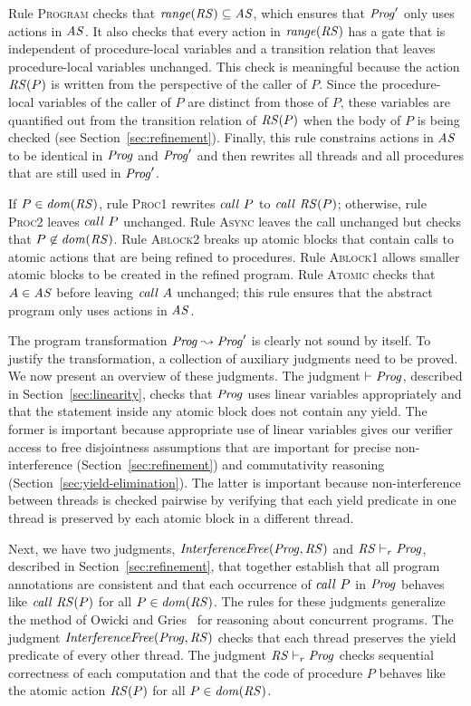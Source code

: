 Rule \textsc{Program} checks that $\mathit{range}(\mathit{RS}) \subseteq \mathit{AS}$,
which ensures that $\mathit{Prog}'$ only uses actions in $\mathit{AS}$.
It also checks that every action in $\mathit{range}(\mathit{RS})$ has a gate 
that is independent of procedure-local variables and a transition relation that leaves 
procedure-local variables unchanged.  
This check is meaningful because the action $\mathit{RS}(P)$ is written from the 
perspective of the caller of $P$.
Since the procedure-local variables of the caller of $P$ are distinct from those of $P$,
these variables are quantified out from the transition relation of $\mathit{RS}(P)$ when 
the body of $P$ is being checked (see Section~\ref{sec:refinement}).
Finally, this rule constrains actions in $\mathit{AS}$ to be identical in $\mathit{Prog}$ and $\mathit{Prog}'$ and then rewrites all threads
and all procedures that are still used in $\mathit{Prog}'$.

If $P \in \mathit{dom}(\mathit{RS})$, rule \textsc{Proc1} rewrites $\mathit{call}\ P$ to $\mathit{call}\ \mathit{RS}(P)$;
otherwise, rule \textsc{Proc2} leaves $\mathit{call}\ P$ unchanged.
Rule \textsc{Async} leaves the call unchanged but checks that $P \not \in \mathit{dom}(\mathit{RS})$.
Rule \textsc{Ablock2} breaks up atomic blocks that contain calls
to atomic actions that are being refined to procedures.
Rule \textsc{Ablock1} allows smaller atomic blocks to be created in the refined program.
Rule \textsc{Atomic} checks that $A \in \mathit{AS}$ before leaving $\mathit{call}\ A$ unchanged;
this rule ensures that the abstract program only uses actions in $\mathit{AS}$.

The program transformation $\mathit{Prog} \leadsto \mathit{Prog}'$ is clearly not sound by itself.
To justify the transformation, a collection of auxiliary judgments need to be proved.
We now present an overview of these judgments.
The judgment $\vdash \mathit{Prog}$, described in Section~\ref{sec:linearity}, 
checks that $\mathit{Prog}$ uses linear variables appropriately and that the statement
inside any atomic block does not contain any yield.
The former is important because appropriate use of linear variables gives our verifier access to free disjointness
assumptions that are important for precise non-interference (Section~\ref{sec:refinement}) and commutativity reasoning (Section~\ref{sec:yield-elimination}).
The latter is important because non-interference between threads is checked pairwise by verifying that each yield predicate
in one thread is preserved by each atomic block in a different thread.

Next, we have two judgments, $\mathit{InterferenceFree}(\mathit{Prog}, \mathit{RS})$ and $\mathit{RS} \vdash_r \mathit{Prog}$,
described in Section~\ref{sec:refinement},
that together establish that all program annotations are consistent and that 
each occurrence of $\mathit{call}\ P$ in $\mathit{Prog}$ behaves like $\mathit{call}\ \mathit{RS}(P)$ 
for all $P \in \mathit{dom}(\mathit{RS})$.
The rules for these judgments generalize the method of Owicki and Gries~\cite{OwickiG76} for reasoning about concurrent programs.
The judgment $\mathit{InterferenceFree}(\mathit{Prog}, \mathit{RS})$ checks that each thread preserves the
yield predicate of every other thread.
The judgment $\mathit{RS} \vdash_r \mathit{Prog}$ checks sequential correctness of each computation
and that the code of procedure $P$ behaves like the atomic action $\mathit{RS}(P)$ for all $P\in\mathit{dom}(\mathit{RS})$.


